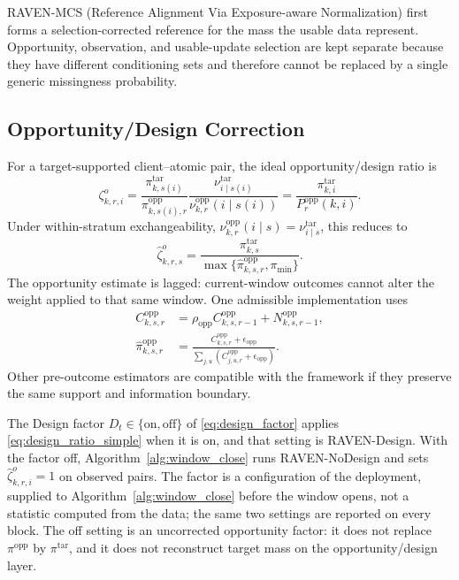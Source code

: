 \documentclass[letterpaper,journal]{IEEEtran}
\begin{document}
RAVEN-MCS (Reference Alignment Via Exposure-aware Normalization) first forms a
selection-corrected reference for the mass the usable data represent.
Opportunity, observation, and usable-update selection are kept separate
because they have different conditioning sets and therefore cannot be
replaced by a single generic missingness probability.

\subsection{Opportunity/Design Correction}
\label{subsec:design_correction}

For a target-supported client--atomic pair, the ideal opportunity/design ratio is
\begin{equation}
 \zeta^{o}_{k,r,i}
 =
 \frac{\pi^{\mathrm{tar}}_{k,s(i)}}
      {\pi^{\mathrm{opp}}_{k,s(i),r}}
 \frac{\nu^{\mathrm{tar}}_{i\mid s(i)}}
      {\nu^{\mathrm{opp}}_{k,r}(i\mid s(i))}
 =
 \frac{\pi^{\mathrm{tar}}_{k,i}}
      {P_r^{\mathrm{opp}}(k,i)}.
 \label{eq:design_ratio_general}
\end{equation}
Under within-stratum exchangeability,
$\nu^{\mathrm{opp}}_{k,r}(i\mid s)=\nu^{\mathrm{tar}}_{i\mid s}$, this reduces to
\begin{equation}
 \widehat\zeta^{o}_{k,r,s}
 =
 \frac{\pi^{\mathrm{tar}}_{k,s}}
 {\max\{\widehat\pi^{\mathrm{opp}}_{k,s,r},\pi_{\min}\}}.
 \label{eq:design_ratio_simple}
\end{equation}
The opportunity estimate is lagged: current-window outcomes cannot alter the
weight applied to that same window.  One admissible implementation uses
\begin{align*}
 C^{\mathrm{opp}}_{k,s,r}
 &=
 \rho_{\mathrm{opp}}C^{\mathrm{opp}}_{k,s,r-1}
 +N^{\mathrm{opp}}_{k,s,r-1},\\
 \widehat\pi^{\mathrm{opp}}_{k,s,r}
 &=
 \frac{C^{\mathrm{opp}}_{k,s,r}+\epsilon_{\mathrm{opp}}}
 {\sum_{j,u}
 (C^{\mathrm{opp}}_{j,u,r}+\epsilon_{\mathrm{opp}})}.
\end{align*}
Other pre-outcome estimators are compatible with the framework if they preserve
the same support and information boundary.

The Design factor $D_t\in\{\mathrm{on},\mathrm{off}\}$ of
\eqref{eq:design_factor} applies \eqref{eq:design_ratio_simple} when it is
on, and that setting is RAVEN-Design.
With the factor off,
Algorithm~\ref{alg:window_close} runs RAVEN-NoDesign and sets $\widehat\zeta^{o}_{k,r,i}=1$ on
observed pairs.  The factor is a configuration of the deployment, supplied to
Algorithm~\ref{alg:window_close} before the window opens, not a statistic
computed from the data; the same two settings are reported on every block.
The off setting is an uncorrected opportunity factor: it
does not replace $\pi^{\mathrm{opp}}$ by $\pi^{\mathrm{tar}}$, and it does
not reconstruct target mass on the opportunity/design layer.
\end{document}
